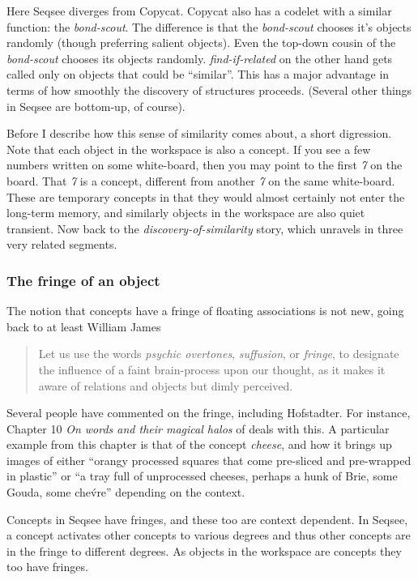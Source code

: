 \documentclass[letterpaper]{article}
\begin{document}
Here Seqsee diverges from Copycat.  Copycat also has a codelet with a similar function: the \emph{bond-scout}.  The difference is that the \emph{bond-scout} chooses it's objects randomly (though preferring salient objects).  Even the top-down cousin of the \emph{bond-scout} chooses its objects randomly.  \emph{find-if-related} on the other hand gets called only on objects that could be ``similar''.  This has a major advantage in terms of how smoothly the discovery of structures proceeds.  (Several other things in Seqsee are bottom-up, of course).

Before I describe how this sense of similarity comes about, a short digression. Note that each object in the workspace is also a concept.  If you see a few numbers written on some white-board, then you may point to the first \emph{7} on the board.  That \emph{7} is a concept, different from another \emph{7} on the same white-board.  These are temporary concepts in that they would almost certainly not enter the long-term memory, and similarly objects in the workspace are also quiet transient. Now back to the \emph{discovery-of-similarity} story, which unravels in three very related segments.

\subsubsection{The fringe of an object}
\label{sec:fringe}

The notion that concepts have a fringe of floating associations is not new, going back to at least William James \cite{James}

\begin{quote}
  Let us use the words \emph{psychic overtones}, \emph{suffusion}, or \emph{fringe}, to designate the influence of a faint brain-process upon our thought, as it makes it aware of relations and objects but dimly perceived.
\end{quote}

  Several people have commented on the fringe, including Hofstadter.  For instance, Chapter 10 \emph{On words and their magical halos} of  deals with this.  A particular example from this chapter is that of the concept \emph{cheese}, and how it brings up images of either ``orangy processed squares that come pre-sliced and pre-wrapped in plastic'' or ``a tray full of unprocessed cheeses, perhaps a hunk of Brie, some Gouda, some che\'vre'' depending on the context.

Concepts in Seqsee have fringes, and these too are context dependent. In Seqsee, a concept activates other concepts to various degrees and thus other concepts are in the fringe to different degrees. As objects in the workspace are concepts they too have fringes.
\end{document}
